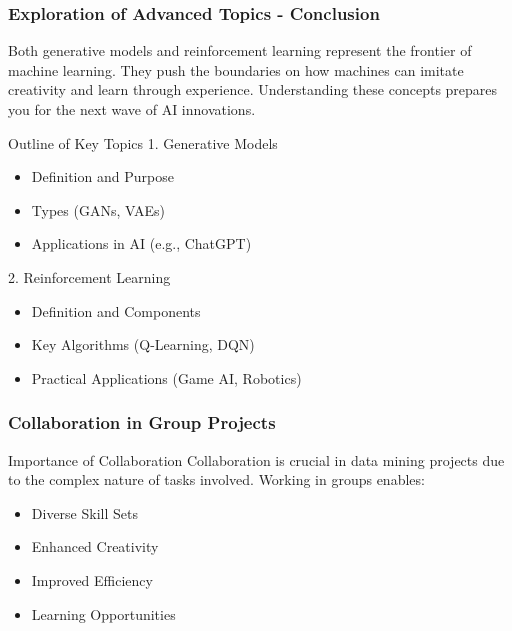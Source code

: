 \documentclass[aspectratio=169]{beamer}
\begin{document}
\begin{frame}[fragile]
    \frametitle{Exploration of Advanced Topics - Conclusion}
    Both generative models and reinforcement learning represent the frontier of machine learning. 
    They push the boundaries on how machines can imitate creativity and learn through experience. 
    Understanding these concepts prepares you for the next wave of AI innovations.

    \begin{block}{Outline of Key Topics}
        1. Generative Models
        \begin{itemize}
            \item Definition and Purpose
            \item Types (GANs, VAEs)
            \item Applications in AI (e.g., ChatGPT)
        \end{itemize}
        
        2. Reinforcement Learning
        \begin{itemize}
            \item Definition and Components 
            \item Key Algorithms (Q-Learning, DQN)
            \item Practical Applications (Game AI, Robotics)
        \end{itemize}
    \end{block}
\end{frame}

\begin{frame}[fragile]
    \frametitle{Collaboration in Group Projects}
    \begin{block}{Importance of Collaboration}
        Collaboration is crucial in data mining projects due to the complex nature of tasks involved. Working in groups enables:
    \end{block}
    \begin{itemize}
        \item Diverse Skill Sets
        \item Enhanced Creativity
        \item Improved Efficiency
        \item Learning Opportunities
    \end{itemize}
\end{frame}
\end{document}
